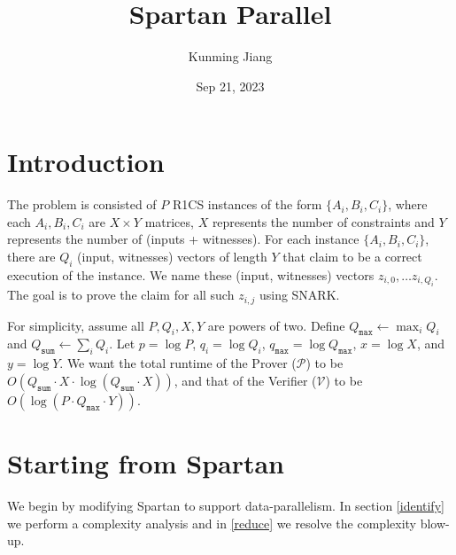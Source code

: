 \documentclass{article}
\title{Spartan Parallel}
\author{Kunming Jiang}
\date{Sep 21, 2023}
\newcommand{\Qsum}{Q_{\mathtt{sum}}}
\newcommand{\Qmax}{Q_{\mathtt{max}}}
\newcommand{\qmax}{q_{\mathtt{max}}}
\renewcommand{\P}{\mathcal{P}}
\newcommand{\V}{\mathcal{V}}
\begin{document}
\maketitle

\section{Introduction}\label{intro}

The problem is consisted of $P$ R1CS instances of the form $\{A_i, B_i, C_i\}$, where each $A_i, B_i, C_i$ are $X \times Y$ matrices, $X$ represents the number of constraints and $Y$ represents the number of (inputs + witnesses). For each instance $\{A_i, B_i, C_i\}$, there are $Q_i$ (input, witnesses) vectors of length $Y$ that claim to be a correct execution of the instance. We name these (input, witnesses) vectors $z_{i, 0},\dots z_{i, Q_i}$. The goal is to prove the claim for all such $z_{i, j}$ using SNARK.

For simplicity, assume all $P, Q_i, X, Y$ are powers of two. Define $\Qmax \leftarrow \max_i Q_i$ and $\Qsum \leftarrow \sum_i Q_i$. Let $p = \log P$, $q_i = \log Q_i$, $\qmax = \log \Qmax$, $x = \log X$, and $y = \log Y$. We want the total runtime of the Prover ($\P$) to be $O(\Qsum \cdot X\cdot\log(\Qsum \cdot X))$, and that of the Verifier ($\V$) to be $O(\log(P \cdot \Qmax \cdot Y))$.

\section{Starting from Spartan}\label{spartan}
We begin by modifying Spartan to support data-parallelism. In section \ref{identify} we perform a complexity analysis and in \ref{reduce} we resolve the complexity blow-up.
\end{document}
